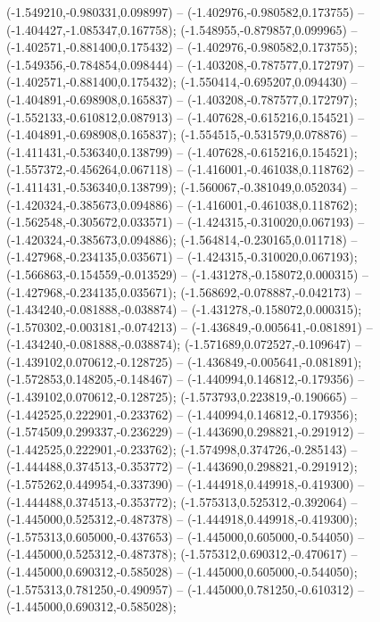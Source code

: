  (-1.549210,-0.980331,0.098997) -- (-1.402976,-0.980582,0.173755) -- (-1.404427,-1.085347,0.167758);
 (-1.548955,-0.879857,0.099965) -- (-1.402571,-0.881400,0.175432) -- (-1.402976,-0.980582,0.173755);
 (-1.549356,-0.784854,0.098444) -- (-1.403208,-0.787577,0.172797) -- (-1.402571,-0.881400,0.175432);
 (-1.550414,-0.695207,0.094430) -- (-1.404891,-0.698908,0.165837) -- (-1.403208,-0.787577,0.172797);
 (-1.552133,-0.610812,0.087913) -- (-1.407628,-0.615216,0.154521) -- (-1.404891,-0.698908,0.165837);
 (-1.554515,-0.531579,0.078876) -- (-1.411431,-0.536340,0.138799) -- (-1.407628,-0.615216,0.154521);
 (-1.557372,-0.456264,0.067118) -- (-1.416001,-0.461038,0.118762) -- (-1.411431,-0.536340,0.138799);
 (-1.560067,-0.381049,0.052034) -- (-1.420324,-0.385673,0.094886) -- (-1.416001,-0.461038,0.118762);
 (-1.562548,-0.305672,0.033571) -- (-1.424315,-0.310020,0.067193) -- (-1.420324,-0.385673,0.094886);
 (-1.564814,-0.230165,0.011718) -- (-1.427968,-0.234135,0.035671) -- (-1.424315,-0.310020,0.067193);
 (-1.566863,-0.154559,-0.013529) -- (-1.431278,-0.158072,0.000315) -- (-1.427968,-0.234135,0.035671);
 (-1.568692,-0.078887,-0.042173) -- (-1.434240,-0.081888,-0.038874) -- (-1.431278,-0.158072,0.000315);
 (-1.570302,-0.003181,-0.074213) -- (-1.436849,-0.005641,-0.081891) -- (-1.434240,-0.081888,-0.038874);
 (-1.571689,0.072527,-0.109647) -- (-1.439102,0.070612,-0.128725) -- (-1.436849,-0.005641,-0.081891);
 (-1.572853,0.148205,-0.148467) -- (-1.440994,0.146812,-0.179356) -- (-1.439102,0.070612,-0.128725);
 (-1.573793,0.223819,-0.190665) -- (-1.442525,0.222901,-0.233762) -- (-1.440994,0.146812,-0.179356);
 (-1.574509,0.299337,-0.236229) -- (-1.443690,0.298821,-0.291912) -- (-1.442525,0.222901,-0.233762);
 (-1.574998,0.374726,-0.285143) -- (-1.444488,0.374513,-0.353772) -- (-1.443690,0.298821,-0.291912);
 (-1.575262,0.449954,-0.337390) -- (-1.444918,0.449918,-0.419300) -- (-1.444488,0.374513,-0.353772);
 (-1.575313,0.525312,-0.392064) -- (-1.445000,0.525312,-0.487378) -- (-1.444918,0.449918,-0.419300);
 (-1.575313,0.605000,-0.437653) -- (-1.445000,0.605000,-0.544050) -- (-1.445000,0.525312,-0.487378);
 (-1.575312,0.690312,-0.470617) -- (-1.445000,0.690312,-0.585028) -- (-1.445000,0.605000,-0.544050);
 (-1.575313,0.781250,-0.490957) -- (-1.445000,0.781250,-0.610312) -- (-1.445000,0.690312,-0.585028);
